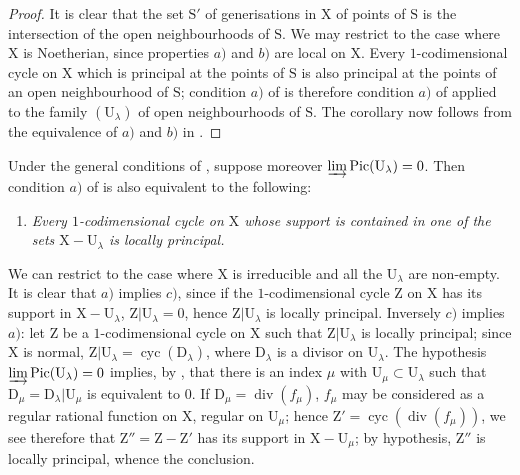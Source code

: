 \begin{proof}
It is clear that the set $\mathrm{S}'$ of generisations in $\mathrm{X}$ of points of $\mathrm{S}$ is the intersection of the open neighbourhoods of $\mathrm{S}$. We may restrict to the case where $\mathrm{X}$ is Noetherian, since properties $a)$ and $b)$ are local on $\mathrm{X}$. Every $1$-codimensional cycle on $\mathrm{X}$ which is principal at the points of $\mathrm{S}$ is also principal at the points of an open neighbourhood of $\mathrm{S}$; condition $a)$ of  is therefore condition $a)$ of  applied to the family $(\mathrm{U}_\lambda)$ of open neighbourhoods of $\mathrm{S}$. The corollary now follows from the equivalence of $a)$ and $b)$ in .
\end{proof}

\begin{remark}[21.13.16]
\label{IV.21.13.16}
Under the general conditions of , suppose moreover $\varinjlim\operatorname{Pic}(\mathrm{U}_\lambda)=0$.
Then condition $a)$ of  is also equivalent to the following:
\begin{enumerate}
  \item[c)] \emph{Every $1$-codimensional cycle on $\mathrm{X}$ whose support is contained in one of the sets $\mathrm{X}-\mathrm{U}_\lambda$ is locally principal.}
\end{enumerate}

We can restrict to the case where $\mathrm{X}$ is irreducible and all the $\mathrm{U}_\lambda$ are non-empty.
It is clear that $a)$ implies $c)$, since if the $1$-codimensional cycle $\mathrm{Z}$ on $\mathrm{X}$ has its support in $\mathrm{X}-\mathrm{U}_\lambda$, $\mathrm{Z}|\mathrm{U}_\lambda=0$, hence $\mathrm{Z}|\mathrm{U}_\lambda$ is locally principal.
Inversely $c)$ implies $a)$: let $\mathrm{Z}$ be a $1$-codimensional cycle on $\mathrm{X}$ such that $\mathrm{Z}|\mathrm{U}_\lambda$ is locally principal; since $\mathrm{X}$ is normal, $\mathrm{Z}|\mathrm{U}_\lambda=\operatorname{cyc}(\mathrm{D}_\lambda)$, where $\mathrm{D}_\lambda$ is a divisor on $\mathrm{U}_\lambda$.
The hypothesis $\varinjlim\operatorname{Pic}(\mathrm{U}_\lambda)=0$ implies, by , that there is an index $\mu$ with $\mathrm{U}_\mu\subset\mathrm{U}_\lambda$ such that $\mathrm{D}_\mu=\mathrm{D}_\lambda|\mathrm{U}_\mu$ is equivalent to $0$.
If $\mathrm{D}_\mu=\operatorname{div}(f_\mu)$, $f_\mu$ may be considered as a regular rational function on $\mathrm{X}$, regular on $\mathrm{U}_\mu$; hence $\mathrm{Z}'=\operatorname{cyc}(\operatorname{div}(f_\mu))$, we see therefore that $\mathrm{Z}''=\mathrm{Z}-\mathrm{Z}'$ has its support in $\mathrm{X}-\mathrm{U}_\mu$; by hypothesis, $\mathrm{Z}''$ is locally principal, whence the conclusion.


\end{remark}
